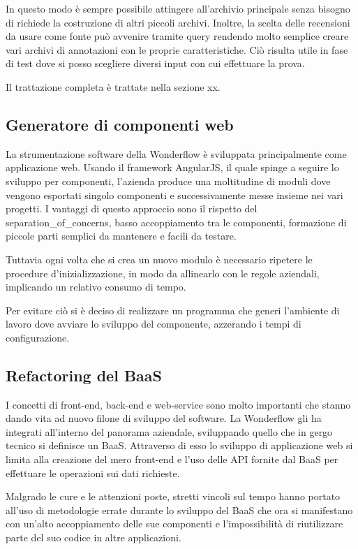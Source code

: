 In questo modo è sempre possibile attingere all'archivio principale senza
bisogno di richiede la costruzione di altri piccoli archivi. Inoltre, la scelta
delle recensioni da usare come fonte può avvenire tramite query rendendo molto
semplice creare vari archivi di annotazioni con le proprie caratteristiche. Ciò
risulta utile in fase di test dove si posso scegliere diversi input con cui
effettuare la prova.

Il trattazione completa è trattate nella sezione xx.

\subsection{Generatore di componenti web}
La strumentazione software della Wonderflow è sviluppata principalmente come
applicazione web. Usando il framework AngularJS, il quale spinge a seguire lo
sviluppo per componenti, l'azienda produce una moltitudine di moduli dove
vengono esportati singolo componenti e successivamente messe insieme nei vari
progetti. I vantaggi di questo approccio sono il rispetto del
\gls{separation_of_concerns}, basso accoppiamento tra le componenti,
formazione di piccole parti semplici da mantenere e facili da testare.

Tuttavia ogni volta che si crea un nuovo modulo è necessario ripetere le
procedure d'inizializzazione, in modo da allinearlo con le regole aziendali,
implicando un relativo consumo di tempo.

Per evitare ciò si è deciso di realizzare un programma che generi l'ambiente di
lavoro dove avviare lo sviluppo del componente, azzerando i tempi di
configurazione.

\subsection{Refactoring del BaaS}
I concetti di \gls{front-end}, \gls{back-end} e \gls{web-service} sono molto
importanti che stanno dando vita ad nuovo filone di sviluppo del software.
La Wonderflow gli ha integrati all'interno del panorama aziendale, sviluppando
quello che in gergo tecnico si definisce un \gls{BaaS}. Attraverso
di esso lo sviluppo di applicazione web si limita alla creazione del mero
\gls{front-end} e l'uso delle \gls{API} fornite dal \gls{BaaS} per effettuare
le operazioni sui dati richieste.

Malgrado le cure e le attenzioni poste, stretti vincoli sul tempo hanno portato
all'uso di metodologie errate durante lo sviluppo del \gls{BaaS} che ora si
manifestano con un'alto accoppiamento delle sue componenti e l'impossibilità
di riutilizzare parte del suo codice in altre applicazioni.

